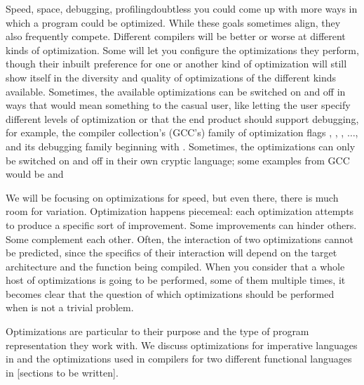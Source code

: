Speed, space, debugging, profiling\empause doubtless you could come up with more ways in which a program could be optimized. While these goals sometimes align, they also frequently compete. Different compilers will be better or worse at different kinds of optimization. Some will let you configure the optimizations they perform, though their inbuilt preference for one or another kind of optimization will still show itself in the diversity and quality of optimizations of the different kinds available. Sometimes, the available optimizations can be switched on and off in ways that would mean something to the casual user, like letting the user specify different levels of optimization or that the end product should support debugging, for example, the  compiler collection's (GCC's) family of optimization flags , , , $\dotsc$,  and its debugging family beginning with . Sometimes, the optimizations can only be switched on and off in their own cryptic language; some examples from GCC would be  and 

We will be focusing on optimizations for speed, but even there, there is much room for variation. Optimization happens piecemeal: each optimization attempts to produce a specific sort of improvement. Some improvements can hinder others. Some complement each other. Often, the interaction of two optimizations cannot be predicted, since the specifics of their interaction will depend on the target architecture and the function being compiled. When you consider that a whole host of optimizations is going to be performed, some of them multiple times, it becomes clear that the question of which optimizations should be performed when is not a trivial problem.\label{background:compilers:middle-end:phase-ordering}

Optimizations are particular to their purpose and the type of program representation they work with. We discuss optimizations for imperative languages in  and the optimizations used in compilers for two different functional languages in [sections to be written].%
